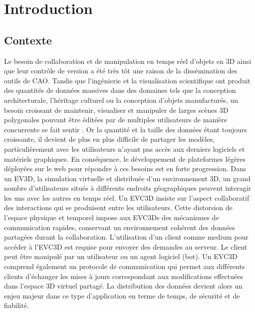 \chapter{Introduction}
\label{sec:chap:intro}
\chaptertable
\section{Contexte}
\label{sec:contexte}
Le besoin de collaboration et de manipulation en temps réel d'objets en \gls{3D} 
ainsi que leur contrôle de version a été très tôt une raison de la dissémination des 
outils de \gls{CAO}. Tandis que l'ingénierie et la visualisation scientifique ont 
produit des quantités de données massives dans des domaines tels que la 
conception architecturale, l'héritage culturel ou la conception d'objets manufacturés, un 
besoin croissant de maintenir, visualiser et manipuler de larges scènes \gls{3D} 
polygonales pouvant être éditées par de multiples utilisateurs de manière 
concurrente se fait sentir \cite{Chandrasegaran2013,Wu2014}. %
Or la quantité et la taille des données 
étant toujours croissante, il devient de plus en plus difficile de partager les 
modèles, particulièrement avec les utilisateurs n'ayant pas accès aux derniers 
logiciels et matériels graphiques. En conséquence,
le développement de plateformes légères déployées sur le web pour répondre à ces 
besoins est en forte progression. 
Dans un \gls{EV3D}, la simulation virtuelle et distribuée d'un 
environnement \gls{3D}, un grand nombre d'utilisateurs situés à différents endroits 
géographiques peuvent 
interagir les uns avec les autres en temps réel. Un \gls{EVC3D} insiste sur l'aspect collaboratif des interactions qui se produisent entre les utilisateurs.
Cette distorsion de l'espace physique et temporel impose aux \glspl{EVC3D} des 
mécanismes de communication rapides, conservant un environnement cohérent
des données partagées durant la collaboration. 
L'utilisation d'un client comme medium pour 
accéder à l'\gls{EVC3D} est requise pour envoyer des demandes au serveur. Le 
client peut être manipulé par un utilisateur ou un agent logiciel (bot).
Un \gls{EVC3D} comprend également un protocole de communication qui 
permet aux différents clients d'échanger les mises à jours correspondant aux 
modifications effectuées dans l'espace \gls{3D} virtuel partagé. La distribution des 
données devient alors un enjeu majeur dans ce type d'application en terme de 
temps, de sécurité et de fiabilité. 



